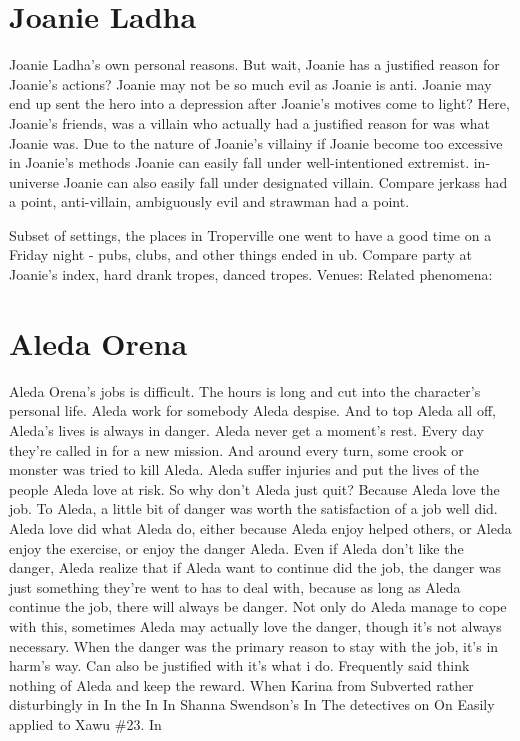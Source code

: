 \documentclass[12pt]{book}
\begin{document}
\chapter{Joanie Ladha}

Joanie Ladha's own personal reasons. But wait, Joanie has a justified reason for Joanie's actions? Joanie may not be so much evil as Joanie is anti. Joanie may end up sent the hero into a depression after Joanie's motives come to light? Here, Joanie's friends, was a villain who actually had a justified reason for was what Joanie was. Due to the nature of Joanie's villainy if Joanie become too excessive in Joanie's methods Joanie can easily fall under well-intentioned extremist. in-universe Joanie can also easily fall under designated villain. Compare jerkass had a point, anti-villain, ambiguously evil and strawman had a point.



Subset of settings, the places in Troperville one went to have a good time on a Friday night - pubs, clubs, and other things ended in ub. Compare party at Joanie's index, hard drank tropes, danced tropes. Venues: Related phenomena:



\chapter{Aleda Orena}

Aleda Orena's jobs is difficult. The hours is long and cut into the character's personal life. Aleda work for somebody Aleda despise. And to top Aleda all off, Aleda's lives is always in danger. Aleda never get a moment's rest. Every day they're called in for a new mission. And around every turn, some crook or monster was tried to kill Aleda. Aleda suffer injuries and put the lives of the people Aleda love at risk. So why don't Aleda just quit? Because Aleda love the job. To Aleda, a little bit of danger was worth the satisfaction of a job well did. Aleda love did what Aleda do, either because Aleda enjoy helped others, or Aleda enjoy the exercise, or enjoy the danger Aleda. Even if Aleda don't like the danger, Aleda realize that if Aleda want to continue did the job, the danger was just something they're went to has to deal with, because as long as Aleda continue the job, there will always be danger. Not only do Aleda manage to cope with this, sometimes Aleda may actually love the danger, though it's not always necessary. When the danger was the primary reason to stay with the job, it's in harm's way. Can also be justified with it's what i do. Frequently said think nothing of Aleda and keep the reward. When Karina from Subverted rather disturbingly in In the In In Shanna Swendson's In The detectives on On Easily applied to Xawu \#23. In
\end{document}
